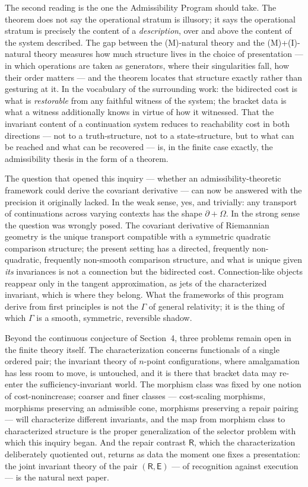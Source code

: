 \documentclass[11pt]{article}
\theoremstyle{remark}
\newcommand{\R}{\mathsf{R}}
\newcommand{\E}{\mathsf{E}}
\begin{document}
The second reading is the one the Admissibility Program should take.
The theorem does not say the operational stratum is illusory; it says
the operational stratum is precisely the content of a
\emph{description}, over and above the content of the system
described. The gap between the (M)-natural theory and the
(M)+(I)-natural theory measures how much structure lives in the
choice of presentation --- in which operations are taken as
generators, where their singularities fall, how their order matters
--- and the theorem locates that structure exactly rather than
gesturing at it. In the vocabulary of the surrounding work: the
bidirected cost is what is \emph{restorable} from any faithful
witness of the system; the bracket data is what a witness
additionally knows in virtue of how it witnessed. That the invariant
content of a continuation system reduces to reachability cost in
both directions --- not to a truth-structure, not to a
state-structure, but to what can be reached and what can be
recovered --- is, in the finite case exactly, the admissibility
thesis in the form of a theorem.

The question that opened this inquiry --- whether an
admissibility-theoretic framework could derive the covariant
derivative --- can now be answered with the precision it originally
lacked. In the weak sense, yes, and trivially: any transport of
continuations across varying contexts has the shape
$\partial + \Omega$. In the strong sense the question was wrongly
posed. The covariant derivative of Riemannian geometry is the unique
transport compatible with a symmetric quadratic comparison
structure; the present setting has a directed, frequently
non-quadratic, frequently non-smooth comparison structure, and what
is unique given \emph{its} invariances is not a connection but the
bidirected cost. Connection-like objects reappear only in the
tangent approximation, as jets of the characterized invariant, which
is where they belong. What the frameworks of this program derive
from first principles is not the $\Gamma$ of general relativity; it
is the thing of which $\Gamma$ is a smooth, symmetric, reversible
shadow.

Beyond the continuous conjecture of Section~4, three problems remain
open in the finite theory itself. The characterization concerns
functionals of a single ordered pair; the invariant theory of
$n$-point configurations, where amalgamation has less room to move,
is untouched, and it is there that bracket data may re-enter the
sufficiency-invariant world. The morphism class was fixed by one
notion of cost-nonincrease; coarser and finer classes ---
cost-scaling morphisms, morphisms preserving an admissible cone,
morphisms preserving a repair pairing --- will characterize
different invariants, and the map from morphism class to
characterized structure is the proper generalization of the selector
problem with which this inquiry began. And the repair contrast $\R$,
which the characterization deliberately quotiented out, returns as
data the moment one fixes a presentation: the joint invariant theory
of the pair $(\R,\E)$ --- of recognition against execution --- is
the natural next paper.
\end{document}
